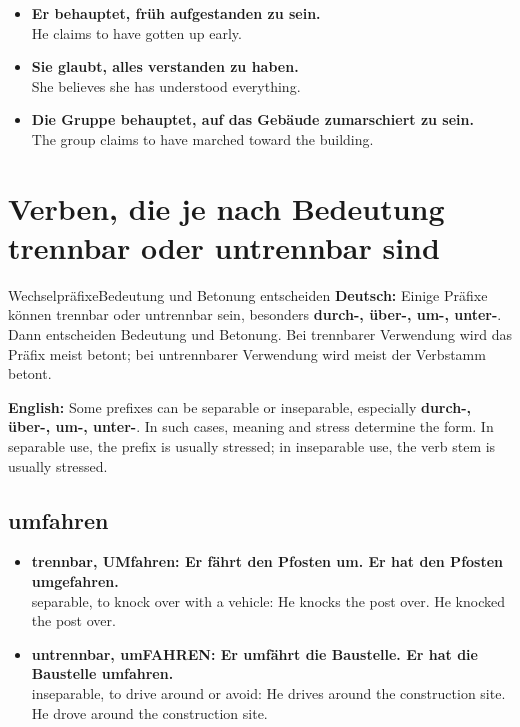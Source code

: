 \documentclass[a4paper,11pt]{article}
\newcommand{\GermanText}[1]{\textbf{Deutsch: }#1\par}
\newcommand{\EnglishText}[1]{{\small\color{SoftGray}\textbf{English: }#1\par}}
\newcommand{\ExampleItem}[2]{\item \textbf{#1}\\{\small\color{SoftGray}#2}}
\begin{document}
        \begin{exbox}
            \begin{itemize}
                \ExampleItem{Er behauptet, früh aufgestanden zu sein.}{He claims to have gotten up early.}
                \ExampleItem{Sie glaubt, alles verstanden zu haben.}{She believes she has understood everything.}
                \ExampleItem{Die Gruppe behauptet, auf das Gebäude zumarschiert zu sein.}{The group claims to have marched toward the building.}
            \end{itemize}
        \end{exbox}


    \section{Verben, die je nach Bedeutung trennbar oder untrennbar sind}

        \begin{grammarentry}{Wechselpräfixe}{Bedeutung und Betonung entscheiden}
            \GermanText{Einige Präfixe können trennbar oder untrennbar sein, besonders \textbf{durch-, über-, um-, unter-}. Dann entscheiden Bedeutung und Betonung. Bei trennbarer Verwendung wird das Präfix meist betont; bei untrennbarer Verwendung wird meist der Verbstamm betont.}
            \EnglishText{Some prefixes can be separable or inseparable, especially \textbf{durch-, über-, um-, unter-}. In such cases, meaning and stress determine the form. In separable use, the prefix is usually stressed; in inseparable use, the verb stem is usually stressed.}
        \end{grammarentry}

        \subsection{\glqq umfahren\grqq}

        \begin{exbox}
            \begin{itemize}
                \ExampleItem{trennbar, \textbf{UMfahren}: Er fährt den Pfosten um. Er hat den Pfosten umgefahren.}{separable, to knock over with a vehicle: He knocks the post over. He knocked the post over.}
                \ExampleItem{untrennbar, um\textbf{FAHREN}: Er umfährt die Baustelle. Er hat die Baustelle umfahren.}{inseparable, to drive around or avoid: He drives around the construction site. He drove around the construction site.}
            \end{itemize}
        \end{exbox}
\end{document}
